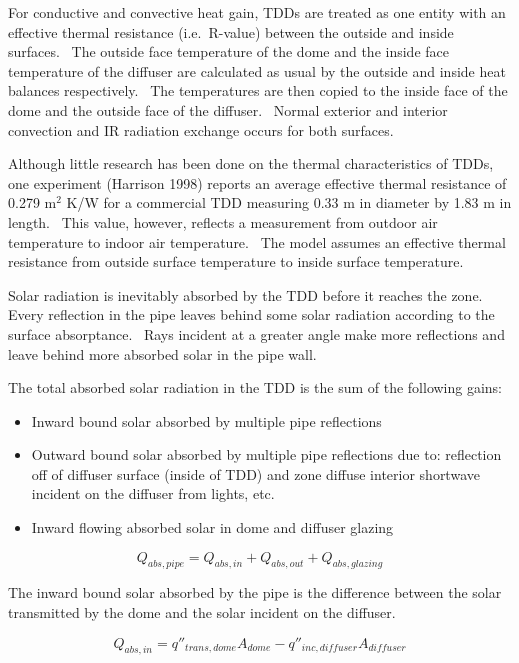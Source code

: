 For conductive and convective heat gain, TDDs are treated as one entity with an effective thermal resistance (i.e.~R-value) between the outside and inside surfaces.~ The outside face temperature of the dome and the inside face temperature of the diffuser are calculated as usual by the outside and inside heat balances respectively.~ The temperatures are then copied to the inside face of the dome and the outside face of the diffuser.~ Normal exterior and interior convection and IR radiation exchange occurs for both surfaces.

Although little research has been done on the thermal characteristics of TDDs, one experiment (Harrison 1998) reports an average effective thermal resistance of 0.279 m\(^{2}\) K/W for a commercial TDD measuring 0.33 m in diameter by 1.83 m in length.~ This value, however, reflects a measurement from outdoor air temperature to indoor air temperature.~ The model assumes an effective thermal resistance from outside surface temperature to inside surface temperature.

Solar radiation is inevitably absorbed by the TDD before it reaches the zone.~ Every reflection in the pipe leaves behind some solar radiation according to the surface absorptance.~ Rays incident at a greater angle make more reflections and leave behind more absorbed solar in the pipe wall.

The total absorbed solar radiation in the TDD is the sum of the following gains:

\begin{itemize}
\item
  Inward bound solar absorbed by multiple pipe reflections
\item
  Outward bound solar absorbed by multiple pipe reflections due to: reflection off of diffuser surface (inside of TDD) and zone diffuse interior shortwave incident on the diffuser from lights, etc.
\item
  Inward flowing absorbed solar in dome and diffuser glazing
\end{itemize}

\begin{equation}
{Q_{abs,pipe}} = {Q_{abs,in}} + {Q_{abs,out}} + {Q_{abs,glazing}}
\end{equation}

The inward bound solar absorbed by the pipe is the difference between the solar transmitted by the dome and the solar incident on the diffuser.

\begin{equation}
{Q_{abs,in}} = {q''_{trans,dome}}{A_{dome}} - {q''_{inc,diffuser}}{A_{diffuser}}
\end{equation}

